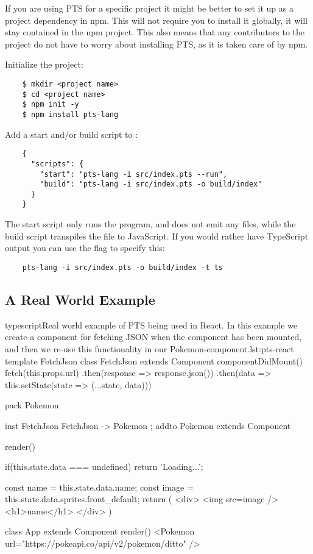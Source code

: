 If you are using PTS for a specific project it might be better to set it up as a project dependency in npm.
This will not require you to install it globally, it will stay contained in the npm project.
This also means that any contributors to the project do not have to worry about installing PTS, as it is taken care of by npm.

Initialize the project:

\begin{verbatim}
    $ mkdir <project name>
    $ cd <project name>
    $ npm init -y
    $ npm install pts-lang
\end{verbatim}

Add a start and/or build script to :

\begin{verbatim}
    {
      "scripts": {
        "start": "pts-lang -i src/index.pts --run",
        "build": "pts-lang -i src/index.pts -o build/index"
      }
    }
\end{verbatim}

The start script only runs the program, and does not emit any files, while the build script transpiles the  file to JavaScript.
If you would rather have TypeScript output you can use the  flag to specify this:

\begin{verbatim}
    pts-lang -i src/index.pts -o build/index -t ts
\end{verbatim}

\subsection{A Real World Example}\label{subsec:a-real-world-example}


\begin{code}{typescript}{Real world example of PTS being used in React. In this example we create a component for fetching JSON when the component has been mounted, and then we re-use this functionality in our Pokemon-component.}{lst:pts-react}
    template FetchJson {
        class FetchJson extends Component {
            componentDidMount() {
                fetch(this.props.url)
                .then(response => response.json())
                .then(data =>
                this.setState(state => ({...state, data})))
            }
        }
    }

    pack Pokemon {
        inst FetchJson { FetchJson -> Pokemon };
        addto Pokemon extends Component {
            render() {
                if(this.state.data === undefined)
                return 'Loading...';

                const name = this.state.data.name;
                const image = this.state.data.sprites.front_default;
                return (
                <div>
                <img src={image} />
                <h1>{name}</h1>
                </div>
                )
            }
        }

        class App extends Component {
            render() {
                <Pokemon
                url="https://pokeapi.co/api/v2/pokemon/ditto" />
            }
        }
    }
\end{code}

